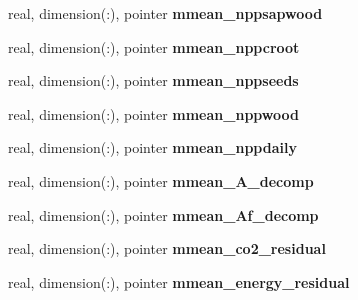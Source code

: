 \begin{DoxyCompactItemize}
\item 
\hypertarget{structed__state__vars_1_1edtype_a541ac079d1cbd91857a8d97fcda942c9}{
real, dimension(:), pointer {\bfseries mmean\_\-nppsapwood}}
\label{structed__state__vars_1_1edtype_a541ac079d1cbd91857a8d97fcda942c9}

\item 
\hypertarget{structed__state__vars_1_1edtype_ae7154540e1f0879c7e5d55c7300ad8b5}{
real, dimension(:), pointer {\bfseries mmean\_\-nppcroot}}
\label{structed__state__vars_1_1edtype_ae7154540e1f0879c7e5d55c7300ad8b5}

\item 
\hypertarget{structed__state__vars_1_1edtype_afa55c9e4a4f41d2c864b2f4b502d8172}{
real, dimension(:), pointer {\bfseries mmean\_\-nppseeds}}
\label{structed__state__vars_1_1edtype_afa55c9e4a4f41d2c864b2f4b502d8172}

\item 
\hypertarget{structed__state__vars_1_1edtype_a2556a2b50bcbb1f5a15367bf077036b9}{
real, dimension(:), pointer {\bfseries mmean\_\-nppwood}}
\label{structed__state__vars_1_1edtype_a2556a2b50bcbb1f5a15367bf077036b9}

\item 
\hypertarget{structed__state__vars_1_1edtype_a7d17644a538b240fa3fab89a8742b5fc}{
real, dimension(:), pointer {\bfseries mmean\_\-nppdaily}}
\label{structed__state__vars_1_1edtype_a7d17644a538b240fa3fab89a8742b5fc}

\item 
\hypertarget{structed__state__vars_1_1edtype_abe12c45267f195908151c4b947c8b704}{
real, dimension(:), pointer {\bfseries mmean\_\-A\_\-decomp}}
\label{structed__state__vars_1_1edtype_abe12c45267f195908151c4b947c8b704}

\item 
\hypertarget{structed__state__vars_1_1edtype_aa583b62e5a2964107bc29ed6291e725a}{
real, dimension(:), pointer {\bfseries mmean\_\-Af\_\-decomp}}
\label{structed__state__vars_1_1edtype_aa583b62e5a2964107bc29ed6291e725a}

\item 
\hypertarget{structed__state__vars_1_1edtype_a7e790fcd89cf98b63a97f8ebeffe05b6}{
real, dimension(:), pointer {\bfseries mmean\_\-co2\_\-residual}}
\label{structed__state__vars_1_1edtype_a7e790fcd89cf98b63a97f8ebeffe05b6}

\item 
\hypertarget{structed__state__vars_1_1edtype_a9bcce4ed07be4c70fb0dcfecaca4bb36}{
real, dimension(:), pointer {\bfseries mmean\_\-energy\_\-residual}}
\label{structed__state__vars_1_1edtype_a9bcce4ed07be4c70fb0dcfecaca4bb36}


\end{DoxyCompactItemize}
